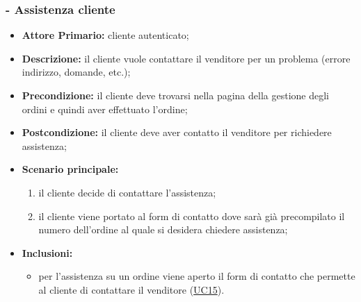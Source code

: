 \subsubsection{ - Assistenza cliente}
\begin{itemize}
    \item \textbf{Attore Primario:} cliente autenticato;
    \item \textbf{Descrizione:} il cliente vuole contattare il venditore per un problema (errore indirizzo, domande, etc.);
    \item \textbf{Precondizione:} il cliente deve trovarsi nella pagina della gestione degli ordini e quindi aver effettuato l'ordine;
    \item \textbf{Postcondizione:} il cliente deve aver contatto il venditore per richiedere assistenza;
    \item \textbf{Scenario principale:}
          \begin{enumerate}
              \item il cliente decide di contattare l'assistenza;
              \item il cliente viene portato al form di contatto dove sarà già precompilato il numero dell'ordine al quale si desidera chiedere assistenza;
          \end{enumerate}
    \item \textbf{Inclusioni:}
          \begin{itemize}
              \item per l'assistenza su un ordine viene aperto il form di contatto che permette al cliente di contattare il venditore (\hyperref[UC15]{UC15}).
          \end{itemize}
\end{itemize}

\stepsubUserCase
